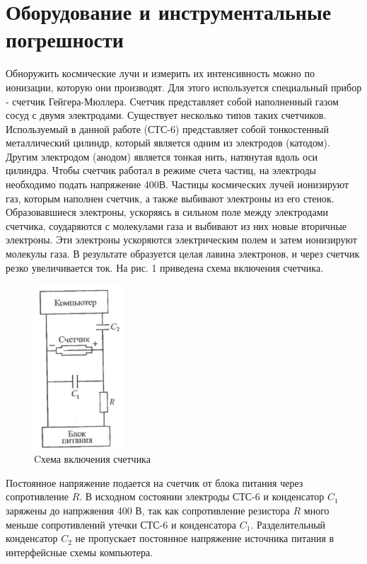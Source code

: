 \documentclass[a4paper,12pt]{article} %
\begin{document}
\section{Оборудование и инструментальные погрешности}
Обноружить космические лучи и измерить их интенсивность можно по ионизации, которую они производят. Для этого используется специальный прибор - счетчик Гейгера-Мюллера. Счетчик представляет собой наполненный газом сосуд с двумя электродами. Существует несколько типов таких счетчиков. Используемый в данной работе (СТС-6) представляет собой тонкостенный металлический цилиндр, который является одним из электродов (катодом). Другим электродом (анодом) является тонкая нить, натянутая вдоль оси цилиндра. Чтобы счетчик работал в режиме счета частиц, на электроды необходимо подать напряжение 400В. Частицы космических лучей ионизируют газ, которым наполнен счетчик, а также выбивают электроны из его стенок. Образовавшиеся электроны, ускоряясь в сильном поле между электродами счетчика, соударяются с молекулами газа и выбивают из них новые вторичные электроны. Эти электроны ускоряются электрическим полем и затем ионизируют молекулы газа. В результате образуется целая лавина электронов, и через счетчик резко увеличивается ток. На рис. 1 приведена схема включения счетчика.

\begin{figure}
\includegraphics[width=0.3\textwidth]{3}
\caption{Cхема включения счетчика}
\end{figure}Постоянное напряжение подается на счетчик от блока питания через сопротивление $R$. В исходном состоянии электроды СТС-6 и конденсатор $C_1$ заряжены до напржяения 400 В, так как сопротивление резистора $R$ много меньше сопротивлений утечки СТС-6 и конденсатора $C_1$. Разделительный конденсатор $C_2$ не пропускает постоянное напряжение источника питания в интерфейсные схемы компьютера.
\end{document}
